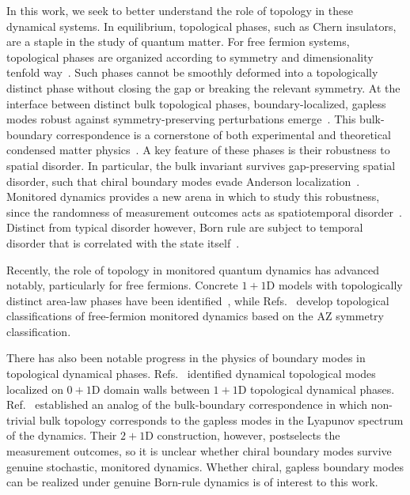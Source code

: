 \documentclass[aps,prb,twocolumn,superscriptaddress,longbibliography,floatfix]{revtex4-2}
\begin{document}
In this work, we seek to better understand the role of topology in these dynamical systems. In equilibrium, topological phases, such as Chern insulators, are a staple in
the study of quantum matter. For free fermion systems, topological phases are organized according to symmetry and dimensionality tenfold way~\cite{AltlandZirnbauer1997,SchnyderRyuFurusakiLudwig2008,Kitaev2009,RyuSchnyderFurusakiLudwig2010,ChiuTeoSchnyderRyu2016}.
Such phases cannot be smoothly deformed into a topologically distinct phase without closing the gap or breaking the relevant symmetry. At the interface between distinct bulk topological phases, boundary-localized, gapless modes robust against symmetry-preserving
perturbations emerge~\cite{Halperin1982,Hatsugai1993,TeoKane2010}. This bulk-boundary correspondence is a cornerstone of both experimental and theoretical condensed matter physics~\cite{HasanKane2010,QiZhang2011}. A key feature of these phases is their robustness to spatial disorder. In particular, the bulk invariant survives gap-preserving spatial disorder, such that chiral boundary modes 
evade Anderson localization~\cite{Halperin1982,EversMirlin2008}. Monitored dynamics provides a new arena in which to study this robustness, since the randomness of measurement outcomes acts as spatiotemporal disorder~\cite{JianBauerKeselmanLudwig2022}. Distinct from typical disorder however, Born rule are subject to temporal disorder that is correlated with the state itself~\cite{JianShapourianBauerLudwig2023,FavaEtAl2023}.

Recently, the role of topology in monitored quantum dynamics has advanced notably, particularly for free fermions. Concrete $1+1$D models with topologically distinct area-law phases have been identified~\cite{KellsMeidanRomito2023,BehrendsVennBeri2024,PanShapourianJian2025,Oshima2025, yang2026decoding}, while Refs.~\cite{BhuiyanPanJian2026,XiaoKawabata2026} develop topological classifications of free-fermion monitored dynamics based on the AZ symmetry classification.

There has also been notable progress in the physics of boundary modes in topological dynamical phases.  Refs.~\cite{PanShapourianJian2025, Oshima2025} identified dynamical topological modes localized on $0+1$D domain walls between $1+1$D topological dynamical phases. Ref.~\cite{XiaoKawabata2026}
established an analog of the bulk-boundary correspondence in which non-trivial bulk topology corresponds to the gapless modes in the Lyapunov spectrum of the dynamics. Their $2+1$D construction, however, postselects the measurement outcomes, so it is unclear whether chiral boundary modes survive genuine stochastic, monitored dynamics. Whether chiral, gapless boundary modes can be realized under genuine Born-rule dynamics is of interest to this work.
\end{document}
